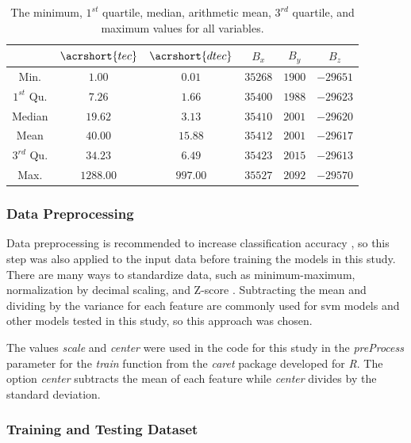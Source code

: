 \documentclass[sn-mathphys-num]{sn-jnl}%
\begin{document}
\begin{table}[!ht]
    \centering
    \caption{The minimum, $1^{st}$ quartile, median, arithmetic mean, $3^{rd}$ quartile, and maximum values for all variables.}
    \label{tab:minmax}
    \begin{tabular}{|c|c|c|c|c|c|}
        \hline
        & $\acrshort{tec}$ & $\acrshort{dtec}$ & $B_{x}$ & $B_{y}$ & $B_{z}$ \\ \hline
        Min. & $1.00$ & $0.01$ & $35268$ & $1900$ & $-29651$ \\ \hline
        $1^{st}$ Qu. & $7.26$ & $1.66$ & $35400$ & $1988$ & $-29623$ \\ \hline
        Median & $19.62$ & $3.13$ & $35410$ & $2001$ & $-29620$ \\ \hline
        Mean & $40.00$ & $15.88$ & $35412$ & $2001$ & $-29617$ \\ \hline
        $3^{rd}$ Qu. & $34.23$ & $6.49$ & $35423$ & $2015$ & $-29613$ \\ \hline
        Max. & $1288.00$ & $997.00$ & $35527$ & $2092$ & $-29570$ \\ \hline
    \end{tabular}
\end{table}

\subsubsection{Data Preprocessing}

Data preprocessing is recommended to increase classification accuracy \cite{Fan2008}, so this step was also applied to the input data before training the models in this study. There are many ways to standardize data, such as minimum-maximum, normalization by decimal scaling, and Z-score \cite{Mohamad2013}. Subtracting the mean and dividing by the variance for each feature are commonly used for \acrshort{svm} models \cite{Fennell2019} and other models tested in this study, so this approach was chosen. 

The values \textit{scale} and \textit{center} were used in the code for this study in the \textit{preProcess} parameter for the \textit{train} function from the \textit{caret} package developed for \textit{R}. The option \textit{center} subtracts the mean of each feature while \textit{center} divides by the standard deviation. 

\subsubsection{Training and Testing Dataset}
\end{document}
